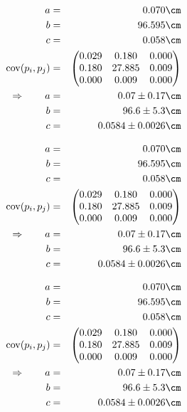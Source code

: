 \begin{eqnarray}
    a &=& 0.070 \cm \nonumber \\
    b &=& 96.595 \cm \nonumber \\
    c &=& 0.058 \cm \nonumber \\
    \mathrm{cov}(p_i, p_j) &=& 
    \begin{pmatrix}
        0.029 &0.180 &0.000 \\
        0.180 &27.885 &0.009 \\
        0.000 &0.009 &0.000 \\
    \end{pmatrix}
\\ \Rightarrow \qquad
    a &=& 0.07 \pm 0.17 \cm\\
    b &=& 96.6 \pm 5.3 \cm\\
    c &=& 0.0584 \pm 0.0026 \cm
\end{eqnarray}

\begin{eqnarray}
    a &=& 0.070 \cm \nonumber \\
    b &=& 96.595 \cm \nonumber \\
    c &=& 0.058 \cm \nonumber \\
    \mathrm{cov}(p_i, p_j) &=& 
    \begin{pmatrix}
        0.029 &0.180 &0.000 \\
        0.180 &27.885 &0.009 \\
        0.000 &0.009 &0.000 \\
    \end{pmatrix}
\\ \Rightarrow \qquad
    a &=& 0.07 \pm 0.17 \cm\\
    b &=& 96.6 \pm 5.3 \cm\\
    c &=& 0.0584 \pm 0.0026 \cm
\end{eqnarray}

\begin{eqnarray}
    a &=& 0.070 \cm \nonumber \\
    b &=& 96.595 \cm \nonumber \\
    c &=& 0.058 \cm \nonumber \\
    \mathrm{cov}(p_i, p_j) &=& 
    \begin{pmatrix}
        0.029 &0.180 &0.000 \\
        0.180 &27.885 &0.009 \\
        0.000 &0.009 &0.000 \\
    \end{pmatrix}
\\ \Rightarrow \qquad
    a &=& 0.07 \pm 0.17 \cm\\
    b &=& 96.6 \pm 5.3 \cm\\
    c &=& 0.0584 \pm 0.0026 \cm
\end{eqnarray}

